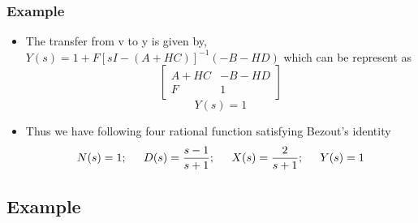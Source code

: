 \documentclass{beamer}
\begin{document}
\begin{frame}
\frametitle{Example}
\begin{small}

        \begin{itemize}
\item The transfer from v to y is given by,\\
 $Y(s)=1+F[sI-(A+HC)]^{-1}(-B-HD)$  which can be represent as 
\[ \left[ \begin{array}{c|c}
A+HC& -B-HD \\
\hline
F & 1 \end{array} \right]\]  
\begin{equation}
Y(s)=1
\end{equation}
\item Thus we have following four rational function satisfying Bezout's identity\\ \begin{equation}
N(s)=1;\hspace{0.2in} D(s)=\frac{s-1}{s+1};\hspace{0.2in} X(s)=\frac{2}{s+1};\hspace{0.2in} Y(s)=1
\end{equation}
\end{itemize}
\end{small}

\end{frame}




\subsection*{Example}
\end{document}

